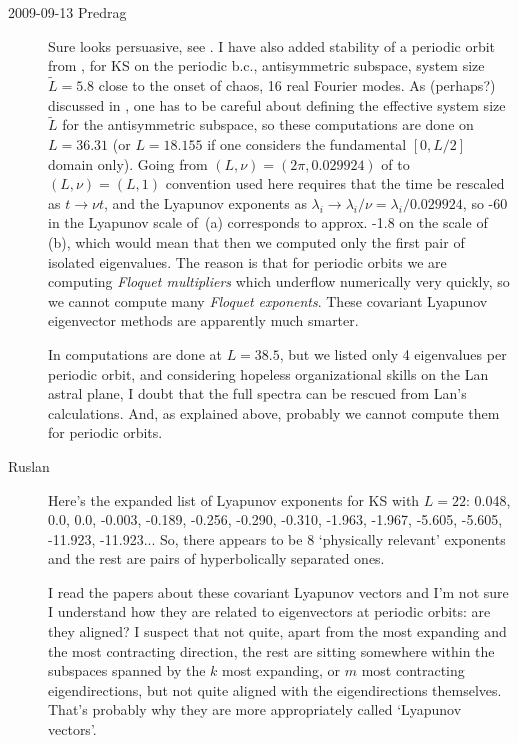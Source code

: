 \begin{description}
\item[2009-09-13 Predrag]
Sure looks persuasive, see . I have also
added stability of a periodic orbit from
, for KS on the periodic b.c.,
antisymmetric subspace, system size $\tilde{L} = 5.8$ close
to the onset of chaos, 16 real Fourier modes. As (perhaps?)
discussed in , one has to be careful about
defining the effective system size $\tilde{L}$ for the
antisymmetric subspace, so these computations are done on
$L=36.31$ (or $L = 18.155$ if one considers the fundamental
$[0,L/2]$ domain only). Going from $(L,\nu) =
(2\pi,0.029924)$ of  to $(L,\nu) =
(L,1)$ convention used here requires that the time be
rescaled as $t \to \nu t$, and the Lyapunov exponents as
$\lambda_i \to \lambda_i/ \nu = \lambda_i/ 0.029924 $, so -60
in the Lyapunov scale of \,(a)
corresponds to approx. -1.8 on the scale of
\,(b), which would mean that then we
computed only the first pair of isolated eigenvalues. The
reason is that for periodic orbits we are computing {\em
Floquet multipliers} which underflow numerically very
quickly, so we cannot compute many {\em Floquet exponents}.
These covariant Lyapunov eigenvector methods are apparently
much smarter.

In  computations are done at $L = 38.5$,
but we listed only 4 eigenvalues per periodic orbit, and
considering hopeless organizational skills on the Lan astral
plane, I doubt that the full spectra can be rescued from
Lan's calculations. And, as explained above, probably we cannot
compute them for periodic orbits.

\item[Ruslan]
 Here's the expanded list of Lyapunov exponents for KS with $L = 22$:
 0.048,    0.0,    0.0,   -0.003,   -0.189,   -0.256,   -0.290,   -0.310,
-1.963,   -1.967,   -5.605,   -5.605,  -11.923,  -11.923...
So, there appears to be 8 `physically relevant' exponents and
the rest are pairs of hyperbolically separated ones.

I read
the papers about these covariant Lyapunov vectors and I'm not
sure I understand how they are related to eigenvectors at
periodic orbits: are they aligned?  I suspect that not quite,
apart from the most expanding and the most contracting
direction, the rest are sitting somewhere within the
subspaces spanned by the $k$ most expanding, or $m$ most
contracting eigendirections, but not quite aligned with the
eigendirections themselves.  That's probably why they are
more appropriately called `Lyapunov vectors'.


\end{description}

